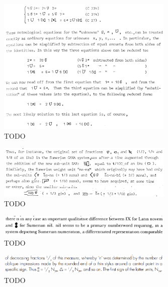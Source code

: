 \documentclass[10pt, a4paper, twoside]{article}
\begin{document}
\begin{figure}
  \begin{center}
  \includegraphics[width=0.75\textwidth]{friberg-15.png}
  \caption{TODO \cite[15]{Friberg1978}\label{FribergEquations}}
  \end{center}
\end{figure}
\begin{figure}
  \begin{center}
  \includegraphics[width=0.75\textwidth]{friberg-49.png}
  \caption{TODO \cite[49]{Friberg1978}\label{FribergFractions}}
  \end{center}
\end{figure}
\begin{figure}
  \begin{center}
  \includegraphics[width=0.75\textwidth]{englund-132.png}
  \caption{TODO \cite[132]{Englund1988}\label{EnglundTwoUC}}
  \end{center}
\end{figure}
\begin{figure}
  \begin{center}
  \includegraphics[width=0.75\textwidth]{englund-113.png}
  \caption{TODO \cite[113]{Englund1998}\label{englund113}}
  \end{center}
\end{figure}
\end{document}
